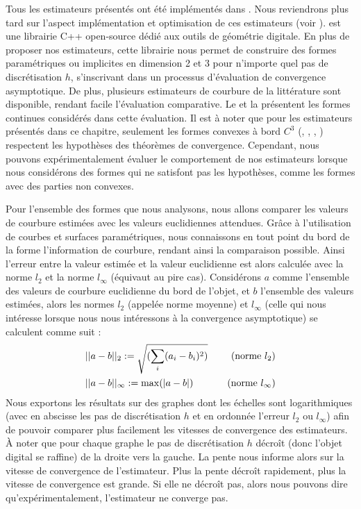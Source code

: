 %
Tous les estimateurs présentés ont été implémentés dans \DGtal \cite{DGtal}.
Nous reviendrons plus tard sur l'aspect implémentation et optimisation de ces
estimateurs (voir ). \DGtal est une librairie
C++ open-source dédié aux outils de géométrie digitale. En plus de proposer nos
estimateurs, cette librairie nous permet de construire des formes paramétriques
ou implicites en dimension 2 et 3 pour n'importe quel pas de discrétisation $h$,
s'inscrivant dans un processus d'évaluation de convergence asymptotique. De
plus, plusieurs estimateurs de courbure de la littérature sont disponible,
rendant facile l'évaluation comparative. Le  et la
 présentent les formes continues considérés
dans cette évaluation. Il est à noter que pour les estimateurs présentés dans ce
chapitre, seulement les formes convexes à bord $C^3$ (\Ellipse, \Sphere,
\RoundedCube, \Ellipsoid) respectent les hypothèses des théorèmes de
convergence. Cependant, nous pouvons expérimentalement évaluer le comportement
de nos estimateurs lorsque nous considérons des formes qui ne satisfont pas les
hypothèses, comme les formes avec des parties non convexes.


Pour l'ensemble des formes que nous analysons, nous allons comparer les valeurs
de courbure estimées avec les valeurs euclidiennes attendues. Grâce à
l'utilisation de courbes et surfaces paramétriques, nous connaissons en tout
point du bord de la forme l'information de courbure, rendant ainsi la
comparaison possible. Ainsi l'erreur entre la valeur estimée et la valeur
euclidienne est alors calculée avec la norme $l_2$ et la norme $l_\infty$
(équivaut au pire cas).
%
Considérons $a$ comme l'ensemble des valeurs de courbure euclidienne du bord de
l'objet, et $b$ l'ensemble des valeurs estimées, alors les normes $l_2$ (appelée
norme moyenne) et $l_\infty$ (celle qui nous intéresse lorsque nous nous
intéressons à la convergence asymptotique) se calculent comme suit :
%
\begin{align}
  &|| a - b ||_2 := \sqrt{(\sum_i(a_i - b_i)^2)} \quad &\text{(norme $l_2$)} \\
  &|| a - b ||_\infty := \max(|a - b|) \quad &\text{(norme $l_\infty$)}
\end{align}
%
Nous exportons les résultats sur des graphes dont les échelles sont
logarithmiques (avec en abscisse les pas de discrétisation $h$ et en ordonnée
l'erreur $l_2$ ou $l_\infty$) afin de pouvoir comparer plus facilement les
vitesses de convergence des estimateurs. À noter que pour chaque graphe le pas
de discrétisation $h$ décroît (donc l'objet digital se raffine) de la droite
vers la gauche. La pente nous informe alors sur la vitesse de convergence de
l'estimateur. Plus la pente décroît rapidement, plus la vitesse de convergence
est grande. Si elle ne décroît pas, alors nous pouvons dire
qu'expérimentalement, l'estimateur ne converge pas.
%
